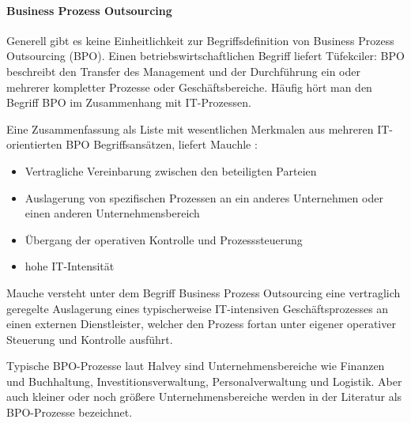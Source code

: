 \paragraph*{Business Prozess Outsourcing }
Generell gibt es keine Einheitlichkeit zur Begriffsdefinition von Business Prozess Outsourcing (BPO). 
Einen betriebswirtschaftlichen Begriff liefert Tüfekciler:
BPO beschreibt den Transfer des Management und der Durchführung ein oder mehrerer kompletter Prozesse oder Geschäftsbereiche.  \cite[14]{tuefekciler2011human}
Häufig hört man den Begriff BPO im Zusammenhang mit IT-Prozessen. 

Eine Zusammenfassung als Liste mit wesentlichen Merkmalen aus mehreren IT-orientierten BPO Begriffsansätzen, liefert Mauchle \cite[6]{mauchle2012business}:
\begin{itemize}
\item Vertragliche Vereinbarung zwischen den beteiligten Parteien
\item Auslagerung von spezifischen Prozessen an ein anderes Unternehmen oder einen anderen Unternehmensbereich
\item Übergang der operativen Kontrolle und Prozesssteuerung
\item hohe IT-Intensität
\end{itemize}
Mauche versteht unter dem Begriff Business Prozess Outsourcing eine vertraglich geregelte Auslagerung eines typischerweise IT-intensiven Geschäftsprozesses an einen externen Dienstleister, welcher den Prozess fortan unter eigener operativer Steuerung und Kontrolle ausführt.
\cite[3]{mauchle2012business}

Typische BPO-Prozesse laut Halvey sind Unternehmensbereiche wie Finanzen und Buchhaltung, Investitionsverwaltung, Personalverwaltung und Logistik. Aber auch kleiner oder noch größere Unternehmensbereiche werden in der Literatur als BPO-Prozesse bezeichnet. \cite[4]{halvey2007business}
 







